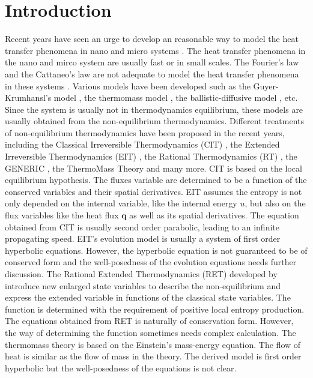 \documentclass[a4paper]{article}
\begin{document}
\section{Introduction}
Recent years have seen an urge to develop an reasonable way to model the heat transfer phenomena in nano and micro systems \cite{chen2005nanoscale,tzou1996macro,wang2007heat,ding2006heat}. The heat transfer phenomena in the nano and mirco system are usually fast or in small scales. The Fourier's law and the Cattaneo's law are not adequate to model the heat transfer phenomena in these systems \cite{chen2005nanoscale,Jou1996extended}. Various models have been developed such as the Guyer-Krumhansl's model \cite{guyer1966solution}, the thermomass model \cite{tzou2010nonlocal}, the ballistic-diffusive model \cite{chen2001ballistic,chen2002ballistic}, etc. Since the system is usually not in thermodynamics equilibrium, these models are usually obtained from the non-equilibrium thermodynamics. Different treatments of non-equilibrium thermodynamics have been proposed in the recent years, including the Classical Irreversible Thermodynamics (CIT) \cite{lebon2008classical}, the Extended Irreversible Thermodynamics (EIT) \cite{Jou1996extended}, the Rational Thermodynamics (RT) \cite{muller1998rational}, the GENERIC \cite{hans2005beyond}, the ThermoMass Theory \cite{zeng2006motion,dong2011generalized} and many more. CIT is based on the local equilibrium hypothesis. The fluxes variable are determined to be a function of the conserved variables and their spatial derivatives. EIT assumes the entropy is not only depended on the internal variable, like the internal energy $u$, but also on the flux variables like the heat flux $\mathbf{q}$ as well as its spatial derivatives. The equation obtained from CIT is usually second order parabolic, leading to an infinite propagating speed. EIT's evolution model is usually a system of first order hyperbolic equations. However, the hyperbolic equation is not guaranteed to be of conserved form and the well-posedness of the evolution equations needs further discussion\cite{Jou1996extended}. The Rational Extended Thermodynamics (RET) developed by \cite{liu2002rational,muller1998formal,Jou1996extended} introduce new enlarged state variables to describe the non-equilibrium and express the extended variable in functions of the classical state variables. The function is determined with the requirement of positive local entropy production. The equations obtained from RET is naturally of conservation form. However, the way of determining the function sometimes needs complex calculation. The thermomass theory is based on the Einstein's mass-energy equation. The flow of heat is similar as the flow of mass in the theory. The derived model is first order hyperbolic but the well-posedness of the equations is not clear.%
\end{document}
